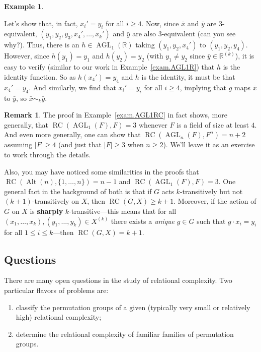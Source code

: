 \documentclass[11pt]{amsart}
\theoremstyle{plain}
\theoremstyle{definition}
\newtheorem{example}{Example}
\newtheorem*{remark*}{Remark}
\theoremstyle{remark}
\DeclareMathOperator{\Alt}{Alt}
\DeclareMathOperator{\AGL}{AGL}
\DeclareMathOperator{\rc}{RC}
\begin{document}
\begin{example}
\begin{center}
\end{center}
Let's show that, in fact, $x_i' = y_i$ for all $i\ge 4$. Now, since $\bar{x}$ and $\bar{y}$ are $3$-equivalent, $(y_1,y_2,y_3,x_4',\ldots,x_k')$ and $\bar{y}$ are also $3$-equivalent (can you see why?). Thus, there is an  $h \in \AGL_1(\mathbb{R})$ taking $(y_1,y_2,x_4')$ to $(y_1,y_2,y_4)$. However, since $h(y_1) = y_1$ and $h(y_2)=y_2$ (with $y_1\neq y_2$ since $\bar{y} \in \mathbb{R}^{(k)}$), it is easy to verify (similar to our work in Example~\ref{exam.AGL1R}) that $h$ is the identity function. So as $h(x_4') = y_4$ and $h$ is the identity, it must be that $x_4' = y_4$. And similarly, we find that $x_i' = y_i$ for all $i\ge 4$, implying that $g$ maps $\bar{x}$ to $\bar{y}$, so  $\bar{x}\sim_k\bar{y}$.
\end{example}

\begin{remark*}
The proof in Example~\ref{exam.AGL1RC} in fact shows, more generally, that $\rc(\AGL_1(F),F)= 3$ whenever $F$ is a field of size at least $4$. And even more generally, one can show that $\rc(\AGL_n(F),F^n)= n+2$ assuming $|F| \ge 4$ (and just that $|F| \ge 3$ when $n\ge 2$). We'll leave it as an exercise to work through the details.

Also, you may have noticed some similarities in the proofs that $\rc(\Alt(n),\{1,\ldots,n\})= n-1$ and $\rc(\AGL_1(F),F)= 3$. One general fact in the background of both is that if $G$ acts $k$-transitively but not $(k+1)$-transitively on $X$, then $\rc(G,X)\ge k+1$. Moreover, if the action of $G$ on $X$ is \textbf{sharply} $k$-transitive---this means that for all $(x_1,\ldots,x_k),(y_1,\ldots,y_k)\in X^{(k)}$ there exists a \emph{unique} $g\in G$ such that $g\cdot x_i = y_i$ for all $1\le i\le k$---then $\rc(G,X)= k+1$. 
\end{remark*}

\subsection{Questions}
There are many open questions in the study of relational complexity. Two particular flavors of problems are:
\begin{enumerate}
\item classify the permutation groups of a given (typically very small or relatively high) relational complexity;
\item determine the relational complexity of familiar families of permutation groups.
\end{enumerate}
\end{document}
